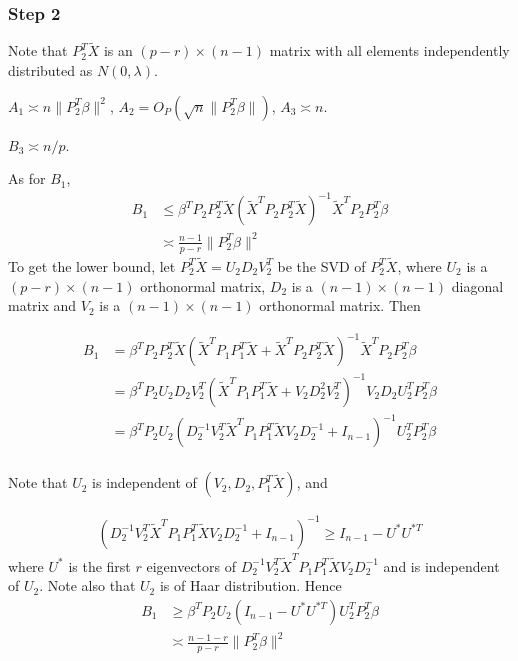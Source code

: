 \documentclass[review]{elsarticle}
\theoremstyle{plain}
\theoremstyle{definition}
\theoremstyle{remark}
\begin{document}
\subsubsection{Step 2}

Note that $P_2^T \tilde{X}$ is an $(p-r)\times (n-1)$ matrix with all elements independently distributed as $N(0,\lambda)$.

    $A_1\asymp n\|P_2^T\beta\|^2$, $A_2=O_P(\sqrt{n}\|P_2^T \beta\|)$, $A_3\asymp n$.

    $B_3\asymp n/p$.

    As for $B_1$, 
\begin{equation}
    \begin{aligned}
        B_1&\leq \beta^T P_2 P_2^T \tilde{X} {(\tilde{X}^T P_2 P_2^T \tilde{X})}^{-1}\tilde{X}^T P_2 P_2^T \beta\\
        &\asymp \frac{n-1}{p-r}\|P_2^T\beta\|^2
    \end{aligned}
\end{equation}
To get the lower bound, let $P_2^T \tilde{X}=U_2 D_2 V_2^T$ be the SVD of $P_2^T \tilde{X}$, where $U_2$ is a $(p-r)\times (n-1)$ orthonormal matrix, $D_2$ is a $(n-1)\times(n-1)$ diagonal matrix and $V_2$ is a $(n-1)\times (n-1)$ orthonormal matrix. Then

\begin{equation}
    \begin{aligned}
        B_1&= \beta^T P_2 P_2^T \tilde{X} {(\tilde{X}^T P_1 P_1^T \tilde{X}+\tilde{X}^T P_2 P_2^T \tilde{X})}^{-1}\tilde{X}^T P_2 P_2^T \beta\\
        &= \beta^T P_2 U_2 D_2 V^T_2 {(\tilde{X}^T P_1 P_1^T \tilde{X}+V_2 D_2^2 V_2^T)}^{-1}V_2 D_2 U_2^T P_2^T \beta\\
        &= \beta^T P_2 U_2  {(D_2^{-1} V_2^T \tilde{X}^T P_1 P_1^T \tilde{X} V_2 D_2^{-1} +I_{n-1})}^{-1} U_2^T P_2^T \beta\\
    \end{aligned}
\end{equation}

Note that $U_2$ is independent of $(V_2,D_2,P_1^T\tilde{X})$, and

\begin{equation}
    \begin{aligned}
        {(D_2^{-1}V_2^T\tilde{X}^T P_1 P_1^T \tilde{X}V_2 D_2^{-1} +I_{n-1})}^{-1}\geq I_{n-1}- U^* U^{*T}
    \end{aligned}
\end{equation}
where $U^*$ is the first $r$ eigenvectors of $D_2^{-1} V_2^T \tilde{X}^T P_1 P_1^T \tilde{X}V_2 D_2^{-1}$ and is independent of $U_2$. Note also that $U_2$ is of Haar distribution. Hence
\begin{equation}
    \begin{aligned}
        B_1&\geq \beta^T P_2 U_2 (I_{n-1}-U^* U^{*T})U_2^T P_2^T \beta\\
        &\asymp \frac{n-1-r}{p-r}\|P_2^T \beta\|^2
    \end{aligned}
\end{equation}
\end{document}
